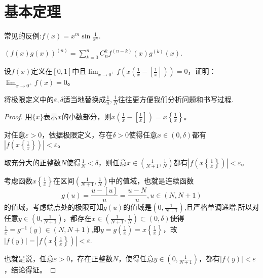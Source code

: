 \documentclass[../../main.tex]{subfiles}
\begin{document}
\section{基本定理}

常见的反例:$f(x)=x^m \sin\frac{1}{x^n}.$

\begin{theorem}[Leibniz公式]\label{theorem:Leibniz公式}
$(f(x)g(x))^{(n)} = \sum_{k = 0}^{n} C_{n}^{k}f^{(n - k)}(x)g^{(k)}(x).$
\end{theorem}

\begin{example}
设\(f(x)\)定义在\([0,1]\)中且\(\lim_{x\rightarrow0^{+}}f\left(x\left(\frac{1}{x}-\left[\frac{1}{x}\right]\right)\right)=0\)，证明：\(\lim_{x\rightarrow0^{+}}f(x)=0\)。
\end{example}
\begin{note}
将极限定义中的$\varepsilon,\delta$适当地替换成$\frac{1}{n},\frac{1}{N}$往往更方便我们分析问题和书写过程.
\end{note}
\begin{proof}
用\(\{x\}\)表示\(x\)的小数部分，则\(x\left(\frac{1}{x}-\left[\frac{1}{x}\right]\right)=x\left\{\frac{1}{x}\right\}\)。

对任意\(\varepsilon>0\)，依据极限定义，存在\(\delta>0\)使得任意\(x\in(0,\delta)\)都有\(\left|f\left(x\left\{\frac{1}{x}\right\}\right)\right|<\varepsilon\)。

取充分大的正整数\(N\)使得\(\frac{1}{N}<\delta\)，则任意\(x\in\left(\frac{1}{N + 1},\frac{1}{N}\right)\)都有\(\left|f\left(x\left\{\frac{1}{x}\right\}\right)\right|<\varepsilon\)。

考虑函数\(x\left\{\frac{1}{x}\right\}\)在区间\(\left(\frac{1}{N + 1},\frac{1}{N}\right)\)中的值域，也就是连续函数
\[g(u)=\frac{u - [u]}{u}=\frac{u - N}{u},u\in(N,N + 1)\]
的值域，考虑端点处的极限可知\(g(u)\)的值域是\(\left(0,\frac{1}{N + 1}\right)\),且严格单调递增.所以对任意\(y\in\left(0,\frac{1}{N + 1}\right)\)，都存在\(x\in\left(\frac{1}{N + 1},\frac{1}{N}\right)\subset(0,\delta)\)使得$\frac{1}{x}=g^{-1}(y)\in(N,N+1)$,即\(y =g(\frac{1}{x})= x\left\{\frac{1}{x}\right\}\)，故\(|f(y)|=\left|f\left(x\left\{\frac{1}{x}\right\}\right)\right|<\varepsilon\).

也就是说，任意\(\varepsilon>0\)，存在正整数\(N\)，使得任意\(y\in\left(0,\frac{1}{N + 1}\right)\)，都有\(|f(y)|<\varepsilon\)，结论得证。

\end{proof}
\end{document}
